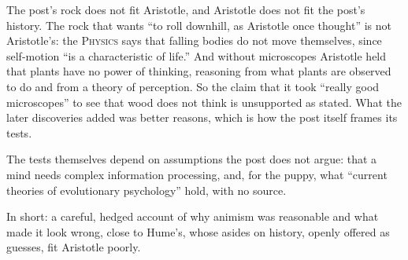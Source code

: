 \begin{afterword}
The post's rock does not fit Aristotle, and Aristotle does not fit the post's history. The rock that wants ``to roll downhill, as Aristotle once thought'' is not Aristotle's: the \textsc{Physics} says that falling bodies do not move themselves, since self-motion ``is a characteristic of life.'' And without microscopes Aristotle held that plants have no power of thinking, reasoning from what plants are observed to do and from a theory of perception. So the claim that it took ``really good microscopes'' to see that wood does not think is unsupported as stated. What the later discoveries added was better reasons, which is how the post itself frames its tests.

The tests themselves depend on assumptions the post does not argue: that a mind needs complex information processing, and, for the puppy, what ``current theories of evolutionary psychology'' hold, with no source.

In short: a careful, hedged account of why animism was reasonable and what made it look wrong, close to Hume's, whose asides on history, openly offered as guesses, fit Aristotle poorly.
\end{afterword}
